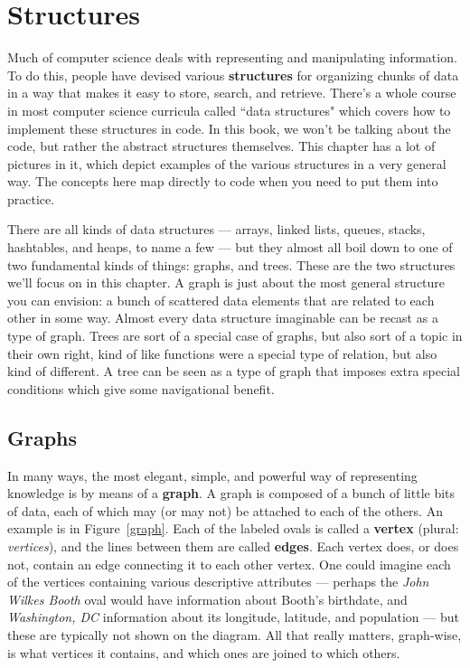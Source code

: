 
\chapter{Structures}

Much of computer science deals with representing and manipulating
information. To do this, people have devised various \textbf{structures}
for organizing chunks of data in a way that makes it easy to store, search,
and retrieve. There's a whole course in most computer science curricula
called ``data structures" which covers how to implement these structures in
code. In this book, we won't be talking about the code, but rather the
abstract structures themselves. This chapter has a lot of pictures in it,
which depict examples of the various structures in a very general way. The
concepts here map directly to code when you need to put them into practice.

There are all kinds of data structures --- arrays, linked lists, queues,
stacks, hashtables, and heaps, to name a few --- but they almost all boil
down to one of two fundamental kinds of things: graphs, and trees.  These
are the two structures we'll focus on in this chapter. A graph is just
about the most general structure you can envision: a bunch of scattered
data elements that are related to each other in some way. Almost every data
structure imaginable can be recast as a type of graph. Trees are sort of a
special case of graphs, but also sort of a topic in their own right, kind
of like functions were a special type of relation, but also kind of
different. A tree can be seen as a type of graph that imposes extra special
conditions which give some navigational benefit.

\section{Graphs}

In many ways, the most elegant, simple, and powerful way of representing
knowledge is by means of a \textbf{graph}. A graph is composed of a bunch of
little bits of data, each of which may (or may not) be attached to each of the
others. An example is in Figure~\ref{graph}. Each of the labeled ovals is
called a \textbf{vertex} (plural: \textit{vertices}), and the lines between
them are called \textbf{edges}. Each vertex does, or does not, contain an edge
connecting it to each other vertex. One could imagine each of the vertices
containing various descriptive attributes --- perhaps the \textsl{John Wilkes
Booth} oval would have information about Booth's birthdate, and
\textsl{Washington, DC} information about its longitude, latitude, and
population --- but these are typically not shown on the diagram. All that
really matters, graph-wise, is what vertices it contains, and which ones are
joined to which others.

